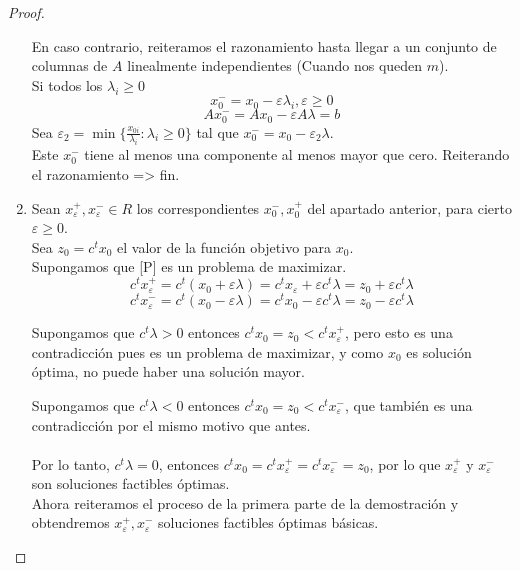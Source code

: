 \documentclass[11pt,fleqn]{book} %
\begin{document}
\begin{proof}
\begin{enumerate}
	En caso contrario, reiteramos el razonamiento hasta llegar a un conjunto de columnas de $A$ linealmente independientes (Cuando nos queden $m$). \\
	Si todos los $\lambda_i \geq 0$ \\
	$$
		x_0^-=x_0-\varepsilon \lambda_i, \varepsilon \geq 0
	$$
	$$
		Ax_0^-=Ax_0-\varepsilon A \lambda = b
	$$
	Sea $\varepsilon_2=\min\{ \frac{x_{0i}}{\lambda_i} : \lambda_i \geq 0 \}$ tal que $x_0^-=x_0- \varepsilon_2 \lambda$. \\
	Este $x_0^-$ tiene al menos una componente al menos mayor que cero. Reiterando el razonamiento => fin.
	\item Sean $x_\varepsilon^+, x_\varepsilon^- \in R$ los correspondientes $x_0^-, x_0^+$ del apartado anterior, para cierto $\varepsilon \geq 0$. \\
	Sea $z_0=c^t x_0$ el valor de la función objetivo para $x_0$. \\
	Supongamos que [P] es un problema de maximizar.
	$$
		c^t x_\varepsilon^+=c^t(x_0+\varepsilon \lambda)=c^tx_\varepsilon+\varepsilon c^t \lambda=z_0+\varepsilon c^t \lambda
	$$
	$$
		c^t x_\varepsilon^-=c^t(x_0-\varepsilon  \lambda)=c^t x_0-\varepsilon c^t \lambda = z_0- \varepsilon c^t\lambda
	$$
	 \par 
	Supongamos que $c^t \lambda >0$ entonces $c^t x_0=z_0< c^t x_\varepsilon^+$, pero esto es una contradicción pues es un problema de maximizar, y como $x_0$ es solución óptima, no puede haber una solución mayor. \\
	 \par 
	Supongamos que $c^t \lambda < 0$ entonces $c^tx_0=z_0<c^tx_\varepsilon^-$, que también es una contradicción por el mismo motivo que antes. \\
	\\
	Por lo tanto, $c^t \lambda = 0$, entonces $c^t x_0=c^t x_\varepsilon^+=c^t x_\varepsilon^-=z_0$, por lo que $x_\varepsilon^+$ y $x_\varepsilon^-$ son soluciones factibles óptimas. \\
	Ahora reiteramos el proceso de la primera parte de la demostración y obtendremos $x_\varepsilon^+, x_\varepsilon^-$ soluciones factibles óptimas básicas.
\end{enumerate}
\end{proof}
\end{document}
